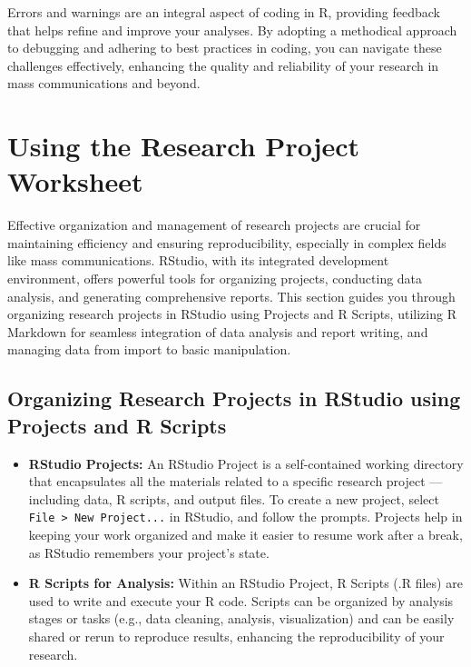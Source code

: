 \documentclass[
]{book}
\begin{document}
Errors and warnings are an integral aspect of coding in R, providing feedback that helps refine and improve your analyses. By adopting a methodical approach to debugging and adhering to best practices in coding, you can navigate these challenges effectively, enhancing the quality and reliability of your research in mass communications and beyond.

\hypertarget{using-the-research-project-worksheet}{%
\section{Using the Research Project Worksheet}\label{using-the-research-project-worksheet}}

Effective organization and management of research projects are crucial for maintaining efficiency and ensuring reproducibility, especially in complex fields like mass communications. RStudio, with its integrated development environment, offers powerful tools for organizing projects, conducting data analysis, and generating comprehensive reports. This section guides you through organizing research projects in RStudio using Projects and R Scripts, utilizing R Markdown for seamless integration of data analysis and report writing, and managing data from import to basic manipulation.

\hypertarget{organizing-research-projects-in-rstudio-using-projects-and-r-scripts}{%
\subsection*{Organizing Research Projects in RStudio using Projects and R Scripts}\label{organizing-research-projects-in-rstudio-using-projects-and-r-scripts}}

\begin{itemize}
\item
  \textbf{RStudio Projects:} An RStudio Project is a self-contained working directory that encapsulates all the materials related to a specific research project --- including data, R scripts, and output files. To create a new project, select \texttt{File\ \textgreater{}\ New\ Project...} in RStudio, and follow the prompts. Projects help in keeping your work organized and make it easier to resume work after a break, as RStudio remembers your project's state.
\item
  \textbf{R Scripts for Analysis:} Within an RStudio Project, R Scripts (.R files) are used to write and execute your R code. Scripts can be organized by analysis stages or tasks (e.g., data cleaning, analysis, visualization) and can be easily shared or rerun to reproduce results, enhancing the reproducibility of your research.
\end{itemize}
\end{document}
